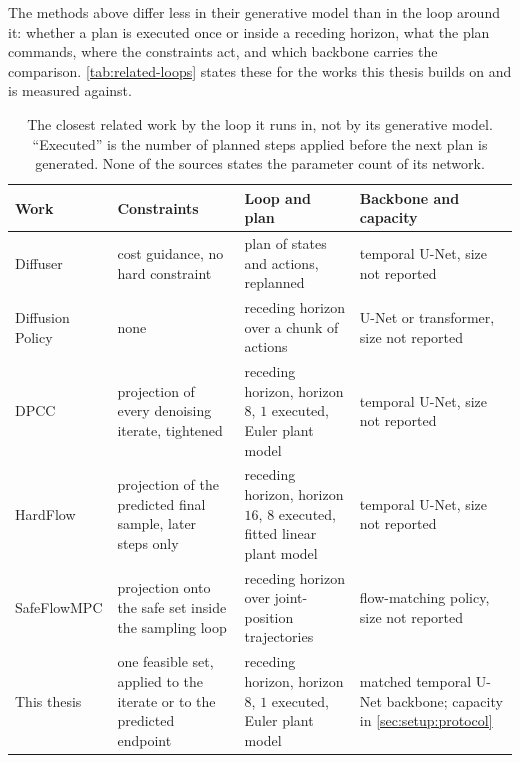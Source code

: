 \documentclass[headsepline,footsepline,footinclude=false,oneside,fontsize=11pt,paper=a4,listof=totoc,bibliography=totoc]{scrbook}
\theoremstyle{definition}
\theoremstyle{plain}
\theoremstyle{remark}
\begin{document}
The methods above differ less in their generative model than in the loop around it: whether a plan is
executed once or inside a receding horizon, what the plan commands, where the constraints act, and
which backbone carries the comparison. \autoref{tab:related-loops} states these for the works this
thesis builds on and is measured against.

\begin{table}[htpb]
  \caption[Planner, loop and constraint mechanism in the closest related work]{The closest related
  work by the loop it runs in, not by its generative model. ``Executed'' is the number of planned
  steps applied before the next plan is generated. None of the sources states the parameter count of
  its network.}
  \label{tab:related-loops}
  \centering\small
  \begin{tabularx}{\linewidth}{lLLL}
    \toprule
    Work & Constraints & Loop and plan & Backbone and capacity \\
    \midrule
    Diffuser \parencite{janner2022planning}
      & cost guidance, no hard constraint
      & plan of states and actions, replanned
      & temporal U-Net, size not reported \\
    Diffusion Policy \parencite{chi2023diffusion}
      & none
      & receding horizon over a chunk of actions
      & U-Net or transformer, size not reported \\
    \ac{DPCC} \parencite{romer2025diffusion}
      & projection of every denoising iterate, tightened
      & receding horizon, horizon $8$, $1$ executed, Euler plant model
      & temporal U-Net, size not reported \\
    HardFlow \parencite{li2025hardflow}
      & projection of the predicted final sample, later steps only
      & receding horizon, horizon $16$, $8$ executed, fitted linear plant model
      & temporal U-Net, size not reported \\
    SafeFlowMPC \parencite{oelerich2026safeflowmpc}
      & projection onto the safe set inside the sampling loop
      & receding horizon over joint-position trajectories
      & flow-matching policy, size not reported \\
    This thesis
      & one feasible set, applied to the iterate or to the predicted endpoint
      & receding horizon, horizon $8$, $1$ executed, Euler plant model
      & matched temporal U-Net backbone; capacity in \autoref{sec:setup:protocol} \\
    \bottomrule
  \end{tabularx}
\end{table}
\end{document}
